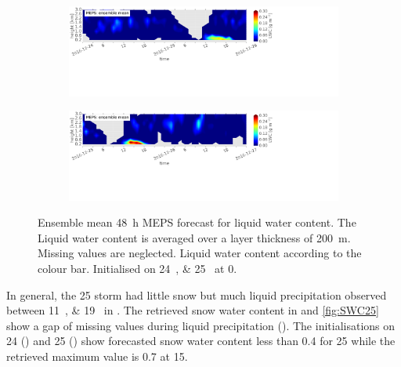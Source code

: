\begin{figure}[t]
	\centering
	\begin{subfigure}[b]{\textwidth}
		\centering
		\includegraphics[trim={0.cm 11.5cm 18.5cm 0.4cm},clip,width=\textwidth]{./fig_vert_LWC_EM/20161224}
		\caption{}\label{fig:LWC:24}
	\end{subfigure}
	\begin{subfigure}[b]{\textwidth}
		\centering
		\includegraphics[trim={0.cm 10cm 18.5cm 0.4cm},clip,width=\textwidth]{./fig_vert_LWC_EM/20161225}
		\caption{}\label{fig:LWC:25}
	\end{subfigure}
	\caption{Ensemble mean \SI{48}{\hour} MEPS forecast for liquid water content. The Liquid water content is averaged over a layer thickness of \SI{200}{\metre}.  Missing values are neglected. Liquid water content according to the colour bar.
		Initialised on \SIlist{24;25}{\dec} at \SI{0}{\UTC}. 
	}\label{fig:LWC:2425}
\end{figure}
\noindent
In general, the \SI{25}{\dec} %
storm had little snow but much %
liquid precipitation observed between \SIlist{11;19}{\UTC} in . The retrieved snow water content in  and \ref{fig:SWC25} show a gap of missing values during liquid precipitation ().
The initialisations on \num{24} () and \SI{25}{\dec} () show forecasted snow water content less than \SI{0.4}{\SWC} for \SI{25}{\dec} while the retrieved maximum value is \SI{0.7}{\SWC} at \SI{15}{\UTC}.
